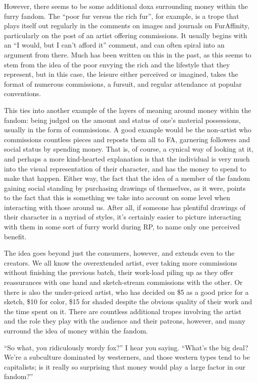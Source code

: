 However, there seems to be some additional doxa surrounding money within the furry fandom.  The ``poor fur versus the rich fur'', for example, is a trope that plays itself out regularly in the comments on images and journals on FurAffinity, particularly on the post of an artist offering commissions.  It usually begins with an ``I would, but I can't afford it'' comment, and can often spiral into an argument from there.  Much has been written on this in the past, as this seems to stem from the idea of the poor envying the rich and the lifestyle that they represent, but in this case, the leisure either perceived or imagined, takes the format of numerous commissions, a fursuit, and regular attendance at popular conventions.

This ties into another example of the layers of meaning around money within the fandom: being judged on the amount and status of one's material possessions, usually in the form of commissions.  A good example would be the non-artist who commissions countless pieces and reposts them all to FA, garnering followers and social status by spending money.  That is, of course, a cynical way of looking at it, and perhaps a more kind-hearted explanation is that the individual is very much into the visual representation of their character, and has the money to spend to make that happen.  Either way, the fact that the idea of a member of the fandom gaining social standing by purchasing drawings of themselves, as it were, points to the fact that this is something we take into account on some level when interacting with those around us.  After all, if someone has plentiful drawings of their character in a myriad of styles, it's certainly easier to picture interacting with them in some sort of furry world during RP, to name only one perceived benefit.

The idea goes beyond just the consumers, however, and extends even to the creators.  We all know the overextended artist, ever taking more commissions without finishing the previous batch, their work-load piling up as they offer reassurances with one hand and sketch-stream commissions with the other.  Or there is also the under-priced artist, who has decided on \$5 as a good price for a sketch, \$10 for color, \$15 for shaded despite the obvious quality of their work and the time spent on it.  There are countless additional tropes involving the artist and the role they play with the audience and their patrons, however, and many surround the idea of money within the fandom.

``So what, you ridiculously wordy fox?'' I hear you saying.  ``What's the big deal?  We're a subculture dominated by westerners, and those western types tend to be capitalists; is it really so surprising that money would play a large factor in our fandom?''

